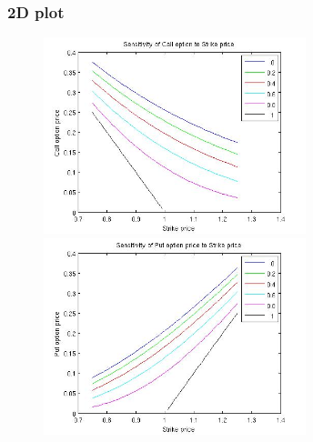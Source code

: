 \documentclass[12pt]{article}
\begin{document}
    \subsubsection*{2D plot}
    \begin{figure}[ht]
    \centering
      \begin{minipage}{.45\textwidth}
        \centering
        \includegraphics[width=3in]{call-strike.jpg}
      \end{minipage}
      \begin{minipage}{.45\textwidth}
        \centering
        \includegraphics[width=3in]{put-strike.jpg}
      \end{minipage}
    \end{figure}
\end{document}
